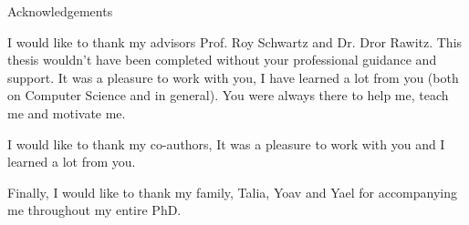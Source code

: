 \begin{center}
    {\Large Acknowledgements}
\end{center}

I would like to thank my advisors Prof. Roy Schwartz and Dr. Dror Rawitz. 
This thesis wouldn’t have been completed without your professional guidance and support.
It was a pleasure to work with you, I have learned a lot from you (both on Computer Science and in general).
You were always there to help me, teach me and motivate me.

I would like to thank my co-authors, It was a pleasure to work with you and I learned a lot from you.

Finally, I would like to thank my family, Talia, Yoav and Yael for accompanying me throughout my entire PhD.

\pagebreak